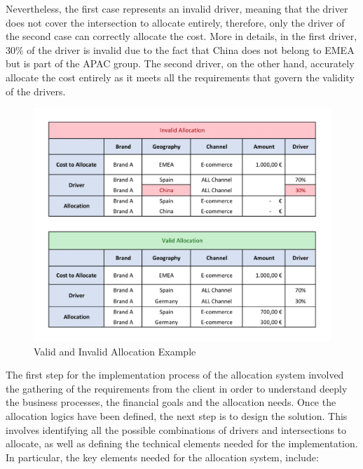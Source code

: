 \documentclass[12pt,a4paper,openright,twoside]{book}
\begin{document}
Nevertheless, the first case represents an invalid driver, meaning that the driver does not cover the intersection to allocate entirely, therefore, only the driver of the second case can correctly allocate the cost.
%
More in details, in the first driver, 30\% of the driver is invalid due to the fact that China does not belong to EMEA but is part of the APAC group.
%
The second driver, on the other hand, accurately allocate the cost entirely as it meets all the requirements that govern the validity of the drivers.

\begin{figure}[ht]
	\centering
	\includegraphics[width=\linewidth]{figures/allocation.pdf}
	\caption{Valid and Invalid Allocation Example}
	\label{fig:allocation}
\end{figure}

The first step for the implementation process of the allocation system involved the gathering of the requirements from the client in order to understand deeply the business processes, the financial goals and the allocation needs.
%
Once the allocation logics have been defined, the next step is to design the solution.
%
This involves identifying all the possible combinations of drivers and intersections to allocate, as well as defining the technical elements needed for the implementation.
%
In particular, the key elements needed for the allocation system, include:
\end{document}

